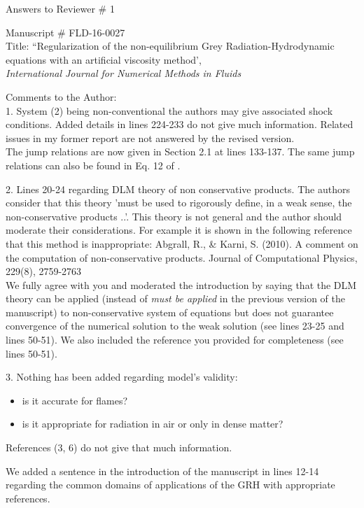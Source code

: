 \documentclass{article}
\begin{document}
\begin{center}
{ \Large Answers to Reviewer \# 1}
\end{center}

\bigskip

\noindent Manuscript \# FLD-16-0027 \\
Title: ``Regularization of the non-equilibrium Grey Radiation-Hydrodynamic equations with an artificial viscosity method', \\
{\it International Journal for Numerical Methods in Fluids}\\

\bigskip

{\color{blue}
Comments to the Author: \\ 
1. System (2) being non-conventional the authors may give associated shock conditions. Added details in lines 224-233 do not give much information. Related issues in my former report are not answered by the revised version.\\}
The jump relations are now given in Section 2.1 at lines 133-137. The same jump relations can also be found in Eq. 12 of \cite{LowrieEdwards}.
\bigskip

{\color{blue}
 2. Lines 20-24 regarding DLM theory of non conservative products. The authors consider that this theory 'must be used to rigorously define, in a weak sense, the non-conservative products ..'. This theory is not general and the author should moderate their considerations. For example it is shown in the following reference that this method is inappropriate:
Abgrall, R., \& Karni, S. (2010). A comment on the computation of non-conservative products. Journal of Computational Physics, 229(8), 2759-2763\\}
We fully agree with you and moderated the introduction by saying that the DLM theory can be applied (instead of \emph{must be applied} in the previous version of the manuscript) to non-conservative system of equations but does not guarantee convergence of the numerical solution to the weak solution (see lines 23-25 and lines 50-51). We also included the reference you provided for completeness (see lines 50-51).
\bigskip

{\color{blue}
3. Nothing has been added regarding model's validity:
\begin{itemize}
\item is it accurate for flames?
\item is it appropriate for radiation in air or only in dense matter?
\end{itemize}
References (3, 6) do not give that much information.\\}
We added a sentence in the introduction of the manuscript in lines 12-14 regarding the common domains of applications of the GRH with appropriate references.
\end{document}
